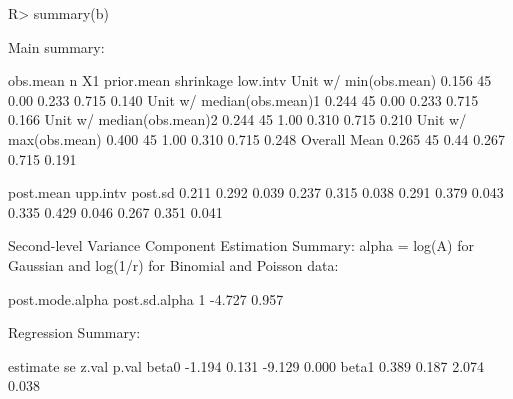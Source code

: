 \documentclass[article]{jss}
\begin{document}

\begin{CodeChunk}
\begin{CodeInput}
R> summary(b)
\end{CodeInput}
\begin{CodeOutput}
Main summary:

                          obs.mean  n   X1 prior.mean shrinkage low.intv
Unit w/ min(obs.mean)        0.156 45 0.00      0.233     0.715    0.140
Unit w/ median(obs.mean)1    0.244 45 0.00      0.233     0.715    0.166
Unit w/ median(obs.mean)2    0.244 45 1.00      0.310     0.715    0.210
Unit w/ max(obs.mean)        0.400 45 1.00      0.310     0.715    0.248
Overall Mean                 0.265 45 0.44      0.267     0.715    0.191

                         post.mean upp.intv post.sd
                             0.211    0.292   0.039
                             0.237    0.315   0.038
                             0.291    0.379   0.043
                             0.335    0.429   0.046
                             0.267    0.351   0.041

Second-level Variance Component Estimation Summary:
alpha = log(A) for Gaussian and log(1/r) for Binomial and Poisson data:

  post.mode.alpha post.sd.alpha
1          -4.727         0.957


Regression Summary:

      estimate    se  z.val p.val
beta0   -1.194 0.131 -9.129 0.000
beta1    0.389 0.187  2.074 0.038
\end{CodeOutput}
\end{CodeChunk}
\end{document}
